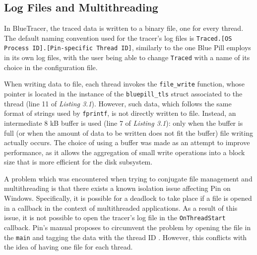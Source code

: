 \subsection{Log Files and Multithreading}

In BlueTracer, the traced data is written to a binary file, one for every thread. The default naming convention used for the tracer's log files is \texttt{Traced.[OS Process ID].[Pin-specific Thread ID]}, similarly to the one Blue Pill employs in its own log files, with the user being able to change \texttt{Traced} with a name of its choice in the configuration file. 

When writing data to file, each thread invokes the \texttt{file\_write} function, whose pointer is located in the instance of the \texttt{bluepill\_tls} struct associated to the thread (line 11 of \textit{Listing 3.1}). However, such data, which follows the same format of strings used by \texttt{fprintf}, is not directly written to file. Instead, an intermediate 8 kB buffer is used (line 7 of \textit{Listing 3.1}): only when the buffer is full (or when the amount of data to be written does not fit the buffer) file writing actually occurs. The choice of using a buffer was made as an attempt to improve performance, as it allows the aggregation of small write operations into a block size that is more efficient for the disk subsystem.

A problem which was encountered when trying to conjugate file management and multithreading is that there exists a known isolation issue affecting Pin on Windows. Specifically, it is possible for a deadlock to take place if a file is opened in a callback in the context of multithreaded applications. As a result of this issue, it is not possible to open the tracer's log file in the \texttt{OnThreadStart} callback. Pin's manual proposes to circumvent the problem by opening the file in the \texttt{main} and tagging the data with the thread ID \cite{Pin}. However, this conflicts with the idea of having one file for each thread.

